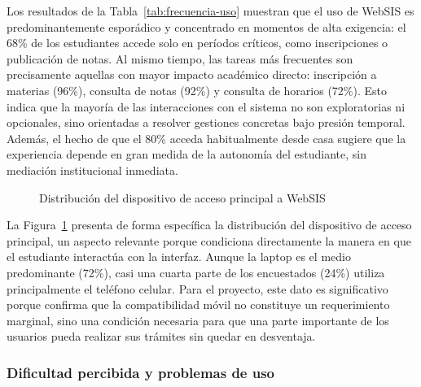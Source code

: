 Los resultados de la Tabla~\ref{tab:frecuencia-uso} muestran que el uso de WebSIS es predominantemente esporádico y concentrado en momentos de alta exigencia: el 68\% de los estudiantes accede solo en períodos críticos, como inscripciones o publicación de notas. Al mismo tiempo, las tareas más frecuentes son precisamente aquellas con mayor impacto académico directo: inscripción a materias (96\%), consulta de notas (92\%) y consulta de horarios (72\%). Esto indica que la mayoría de las interacciones con el sistema no son exploratorias ni opcionales, sino orientadas a resolver gestiones concretas bajo presión temporal. Además, el hecho de que el 80\% acceda habitualmente desde casa sugiere que la experiencia depende en gran medida de la autonomía del estudiante, sin mediación institucional inmediata.
 
\begin{figure}[h!]
\centering
{}
\caption{Distribución del dispositivo de acceso principal a WebSIS}
\label{fig:dispositivo-acceso}
\end{figure}

La Figura~\ref{fig:dispositivo-acceso} presenta de forma específica la distribución del dispositivo de acceso principal, un aspecto relevante porque condiciona directamente la manera en que el estudiante interactúa con la interfaz. Aunque la laptop es el medio predominante (72\%), casi una cuarta parte de los encuestados (24\%) utiliza principalmente el teléfono celular. Para el proyecto, este dato es significativo porque confirma que la compatibilidad móvil no constituye un requerimiento marginal, sino una condición necesaria para que una parte importante de los usuarios pueda realizar sus trámites sin quedar en desventaja.
 
\subsubsection{Dificultad percibida y problemas de uso}
 
